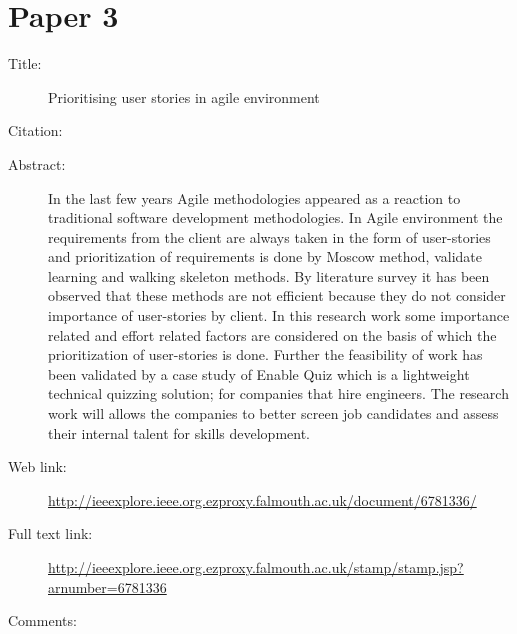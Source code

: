 \documentclass{scrartcl}
\begin{document}
\section*{Paper 3}
\begin{description}
\item[Title:] Prioritising user stories in agile environment
\item[Citation:] \cite{bibtex_key}
\item[Abstract:] In the last few years Agile methodologies appeared as a reaction to traditional software development methodologies. In Agile environment the requirements from the client are always taken in the form of user-stories and prioritization of requirements is done by Moscow method, validate learning and walking skeleton methods. By literature survey it has been observed that these methods are not efficient because they do not consider importance of user-stories by client. In this research work some importance related and effort related factors are considered on the basis of which the prioritization of user-stories is done. Further the feasibility of work has been validated by a case study of Enable Quiz which is a lightweight technical quizzing solution; for companies that hire engineers. The research work will allows the companies to better screen job candidates and assess their internal talent for skills development.
\item[Web link:]\url {http://ieeexplore.ieee.org.ezproxy.falmouth.ac.uk/document/6781336/}
\item[Full text link:] \url{http://ieeexplore.ieee.org.ezproxy.falmouth.ac.uk/stamp/stamp.jsp?arnumber=6781336}
\item[Comments:]  
\end{description}
\end{document}
